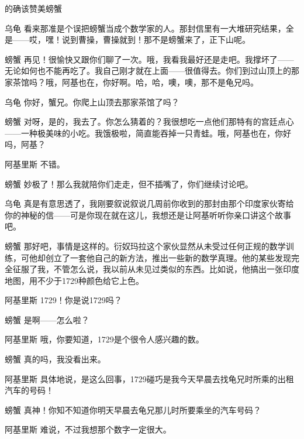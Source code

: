 \begin{dialog}{的确该赞美螃蟹}
\begin{dialogue}
\item[乌龟]看来那准是个误把螃蟹当成个数学家的人。那封信里有一大堆研究结果，全是——哎，嘿！说到曹操，曹操就到！那不是螃蟹来了，正下山呢。

\item[螃蟹]再见！很愉快又跟你们聊了一次。哦，我看我最好还是走吧。我撑坏了——无论如何也不能再吃了。我自己刚才就在上面——很值得去。你们到过山顶上的那家茶馆吗？哦，阿基也在，你好啊。哈，哈，噢，噢，那不是龟兄吗。

\item[乌龟]你好，蟹兄。你爬上山顶去那家茶馆了吗？

\item[螃蟹]对呀，是的，我去了。你怎么猜着的？我很想吃一点他们那特有的宫廷点心——一种极美味的小吃。我饿极啦，简直能吞掉一只青蛙。哦，阿基也在，你好吗，阿基？

\item[阿基里斯]不错。

\item[螃蟹]妙极了！那么我就陪你们走走，但不插嘴了，你们继续讨论吧。

\item[乌龟]真是有意思透了，我刚要叙说叙说几周前你收到的那封由那个印度家伙寄给你的神秘的信——可是你现在就在这儿，我想还是让阿基听听你亲口讲这个故事吧。

\item[螃蟹]那好吧，事情是这样的。衍奴玛拉这个家伙显然从未受过任何正规的数学训练，可他却创立了一套他自己的新方法，推出一些新的数学真理。他的某些发现完全征服了我，不管怎么说，我以前从未见过类似的东西。比如说，他搞出一张印度地图，用不少于1729种颜色给它上色。

\item[阿基里斯]1729！你是说1729吗？

\item[螃蟹]是啊——怎么啦？

\item[阿基里斯]哦，你要知道，1729是个很令人感兴趣的数。

\item[螃蟹]真的吗，我没看出来。

\item[阿基里斯]具体地说，是这么回事，1729碰巧是我今天早晨去找龟兄时所乘的出租汽车的号码！

\item[螃蟹]真神！你知不知道你明天早晨去龟兄那儿时所要乘坐的汽车号码？

\item[阿基里斯]难说，不过我想那个数字一定很大。


\end{dialogue}
\end{dialog}
